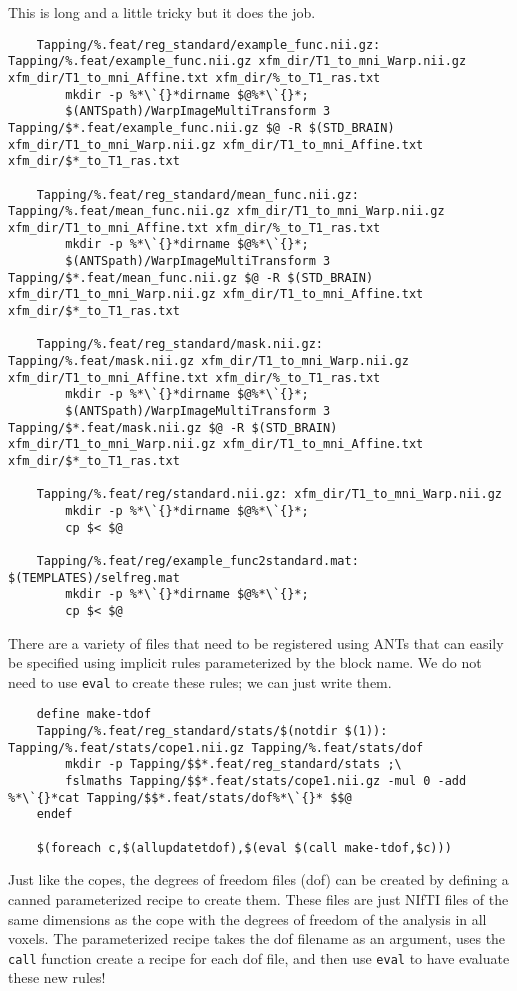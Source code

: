 This is long and a little tricky but it does the job.

\begin{lstlisting}
	Tapping/%.feat/reg_standard/example_func.nii.gz: Tapping/%.feat/example_func.nii.gz xfm_dir/T1_to_mni_Warp.nii.gz xfm_dir/T1_to_mni_Affine.txt xfm_dir/%_to_T1_ras.txt
		mkdir -p %*\`{}*dirname $@%*\`{}*;
		$(ANTSpath)/WarpImageMultiTransform 3 Tapping/$*.feat/example_func.nii.gz $@ -R $(STD_BRAIN) xfm_dir/T1_to_mni_Warp.nii.gz xfm_dir/T1_to_mni_Affine.txt xfm_dir/$*_to_T1_ras.txt

	Tapping/%.feat/reg_standard/mean_func.nii.gz: Tapping/%.feat/mean_func.nii.gz xfm_dir/T1_to_mni_Warp.nii.gz xfm_dir/T1_to_mni_Affine.txt xfm_dir/%_to_T1_ras.txt
		mkdir -p %*\`{}*dirname $@%*\`{}*;
		$(ANTSpath)/WarpImageMultiTransform 3 Tapping/$*.feat/mean_func.nii.gz $@ -R $(STD_BRAIN) xfm_dir/T1_to_mni_Warp.nii.gz xfm_dir/T1_to_mni_Affine.txt xfm_dir/$*_to_T1_ras.txt

	Tapping/%.feat/reg_standard/mask.nii.gz: Tapping/%.feat/mask.nii.gz xfm_dir/T1_to_mni_Warp.nii.gz xfm_dir/T1_to_mni_Affine.txt xfm_dir/%_to_T1_ras.txt
		mkdir -p %*\`{}*dirname $@%*\`{}*;
		$(ANTSpath)/WarpImageMultiTransform 3 Tapping/$*.feat/mask.nii.gz $@ -R $(STD_BRAIN) xfm_dir/T1_to_mni_Warp.nii.gz xfm_dir/T1_to_mni_Affine.txt xfm_dir/$*_to_T1_ras.txt

	Tapping/%.feat/reg/standard.nii.gz: xfm_dir/T1_to_mni_Warp.nii.gz
		mkdir -p %*\`{}*dirname $@%*\`{}*;
		cp $< $@

	Tapping/%.feat/reg/example_func2standard.mat: $(TEMPLATES)/selfreg.mat
		mkdir -p %*\`{}*dirname $@%*\`{}*;
		cp $< $@
\end{lstlisting}
There are a variety of files that need to be registered using ANTs
that can easily be specified using implicit rules parameterized by the
block name. We do not need to use \texttt{eval} to create these rules;
we can just write them. 

\begin{lstlisting}
	define make-tdof 
	Tapping/%.feat/reg_standard/stats/$(notdir $(1)): Tapping/%.feat/stats/cope1.nii.gz Tapping/%.feat/stats/dof 
		mkdir -p Tapping/$$*.feat/reg_standard/stats ;\
		fslmaths Tapping/$$*.feat/stats/cope1.nii.gz -mul 0 -add %*\`{}*cat Tapping/$$*.feat/stats/dof%*\`{}* $$@
	endef 

	$(foreach c,$(allupdatetdof),$(eval $(call make-tdof,$c))) 
\end{lstlisting}
Just like the copes, the degrees of freedom files (dof) can be 
created by defining a canned parameterized recipe to create 
them. These files are just NIfTI files of the same dimensions as the 
cope with the degrees of freedom of the analysis in all voxels.  The 
parameterized recipe takes the dof filename as an argument, uses the \texttt{call}
function create a \maken{} recipe for each dof file, and then use 
\texttt{eval} to have \maken{} evaluate these new rules!

